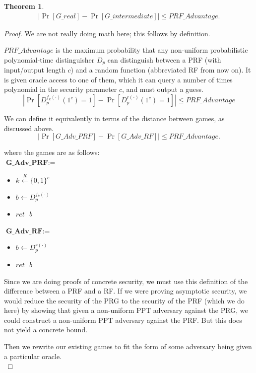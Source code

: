 \documentclass[12pt,lot, lof]{puthesis}
\newenvironment{game}
{ \begin{itemize}[noitemsep,nolistsep] 
}
{ \end{itemize}                  }
\newcommand{\s} {\textrm{ }}
\newcommand{\bt}{\{0,1\}}
\newtheorem{thm}{Theorem}
\begin{document}
\begin{thm} \begin{gather*}|\Pr[G\_real] - \Pr[G\_intermediate]| \leq PRF\_Advantage.\end{gather*} \end{thm}
\begin{proof} 
We are not really doing math here; this follows by definition.

$PRF\_Advantage$ is the maximum probability that any non-uniform probabilistic polynomial-time distinguisher $D_p$ can distinguish between a PRF (with input/output length $c$) and a random function (abbreviated RF from now on). It is given oracle access to one of them, which it can query a number of times polynomial in the security parameter $c$, and must output a guess.
$$| \Pr[ D_p^{f_k(\cdot)}(1^c) = 1] - \Pr[ D_p^{r(\cdot)}(1^c)=1 ] | \leq PRF\_Advantage$$

We can define it equivalently in terms of the distance between games, as discussed above.
$$| \Pr[ G\_Adv\_PRF] - \Pr[G\_Adv\_RF] | \leq PRF\_Advantage.$$

where the games are as follows:\\

$\textbf{G\_Adv\_PRF} := $
\begin{game}
\item[] $k \xleftarrow{R} \bt^c$
\item[] $b \leftarrow D_p^{f_k(\cdot)}$ 
\item[] $ret \s b$ \\
\end{game}

$\textbf{G\_Adv\_RF} := $
\begin{game}
\item[] $b \leftarrow D_p^{r(\cdot)}$ 
\item[] $ret \s b$ \\
\end{game}

Since we are doing proofs of concrete security, we must use this definition of the difference between a PRF and a RF. If we were proving asymptotic security, we would reduce the security of the PRG to the security of the PRF (which we do here) by showing that given a non-uniform PPT adversary against the PRG, we could construct a non-uniform PPT adversary against the PRF. But this does not yield a concrete bound.

Then we rewrite our existing games to fit the form of some adversary being given a particular oracle.\\


\end{proof}
\end{document}
